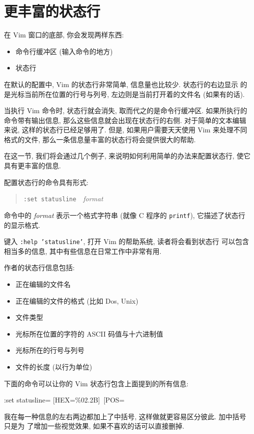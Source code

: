 \section{更丰富的状态行}
\label{sec:a_more_informative_status_line}
在 Vim 窗口的底部, 你会发现两样东西:
\begin{itemize}
    \item 命令行缓冲区 (输入命令的地方)
    \item 状态行
\end{itemize}
在默认的配置中, Vim 的状态行非常简单, 信息量也比较少. 状态行的右边显示
的是光标当前所在位置的行号与列号, 左边则是当前打开着的文件名 (如果有的话).

当执行 Vim 命令时, 状态行就会消失, 取而代之的是命令行缓冲区. 如果所执行的
命令带有输出信息, 那么这些信息就会出现在状态行的右侧.
对于简单的文本编辑来说, 这样的状态行已经足够用了. 但是, 如果用户需要天天使用
Vim 来处理不同格式的文件, 那么一条信息量丰富的状态行将会提供很大的帮助.

在这一节, 我们将会通过几个例子, 来说明如何利用简单的办法来配置状态行, 使它
具有更丰富的信息.

配置状态行的命令具有形式:
\begin{quotation}
\texttt{:set statusline}\ \ \textit{format}
\end{quotation}
命令中的 \textit{format} 表示一个格式字符串 (就像 C 程序的 \texttt{printf}),
它描述了状态行的显示格式.

键入 \texttt{:help 'statusline'}, 打开 Vim 的帮助系统, 读者将会看到状态行
可以包含相当多的信息, 其中有些信息在日常工作中非常有用.

作者的状态行信息包括:
\begin{itemize}
    \item 正在编辑的文件名
    \item 正在编辑的文件的格式 (比如 Dos, Unix)
    \item 文件类型
    \item 光标所在位置的字符的 ASCII 码值与十六进制值
    \item 光标所在的行号与列号
    \item 文件的长度 (以行为单位)
\end{itemize}
下面的命令可以让你的 Vim 状态行包含上面提到的所有信息:
\begin{vimcmd}
:set statusline=%
 [HEX=\%02.2B]\ [POS=%
\end{vimcmd}
我在每一种信息的左右两边都加上了中括号, 这样做就更容易区分彼此. 加中括号只是为
了增加一些视觉效果, 如果不喜欢的话可以直接删掉.

